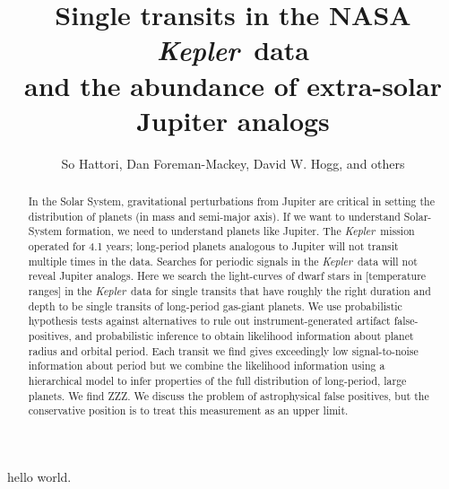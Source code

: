 \documentclass[12pt, preprint]{aastex}
\newcounter{affil}
\newcommand{\project}[1]{\textsl{#1}}
\newcommand{\Kepler}{\project{Kepler}}
\begin{document}
\title{%
  Single transits in the NASA \Kepler\ data\\
  and the abundance of extra-solar Jupiter analogs}

\author{%
  So Hattori\altaffilmark{\ref{nyuad}},
  Dan Foreman-Mackey\altaffilmark{\ref{ccpp}},
  David W. Hogg\altaffilmark{\ref{ccpp}, \ref{cds}, \ref{mpia}},
  and others}
\label{nyuad}
\label{ccpp}
\label{cds}
\label{mpia}

\begin{abstract}
In the Solar System, gravitational perturbations from Jupiter are
critical in setting the distribution of planets (in mass and
semi-major axis).
If we want to understand Solar-System formation, we need to understand
planets like Jupiter.
The \Kepler\ mission operated for 4.1 years; long-period planets
analogous to Jupiter will not transit multiple times in the data.
Searches for periodic signals in the \Kepler\ data will not reveal
Jupiter analogs.
Here we search the light-curves of dwarf stars in [temperature ranges]
in the \Kepler\ data for single transits that have roughly the right
duration and depth to be single transits of long-period gas-giant
planets.
We use probabilistic hypothesis tests against alternatives to rule out
instrument-generated artifact false-positives, and probabilistic
inference to obtain likelihood information about planet radius and
orbital period.
Each transit we find gives exceedingly low signal-to-noise information
about period but we combine the likelihood information using a
hierarchical model to infer properties of the full distribution of
long-period, large planets.
We find ZZZ.
We discuss the problem of astrophysical false positives, but the
conservative position is to treat this measurement as an upper limit.
\end{abstract}

hello world.
\end{document}

